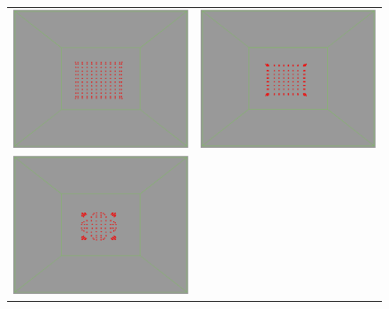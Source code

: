 \begin{figure}[htbp]
\begin{center}
\begin{tabular}{cc}
\includegraphics[scale= 0.15]{figures/coh1.eps} &
\includegraphics[scale= 0.15]{figures/coh2.eps} \\
\includegraphics[scale= 0.15]{figures/coh3.eps} &

\end{tabular}
\end{center}
\end{figure}
